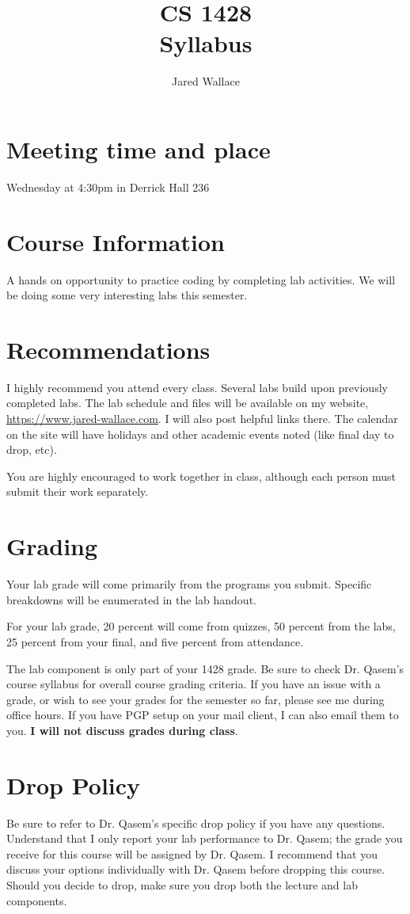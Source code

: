 \documentclass[letterpaper,12pt]{article}
\title{\Large CS 1428\\Syllabus}
\author{Jared Wallace}
\date{}
\begin{document}
\maketitle

\vspace{30mm}

\section*{Meeting time and place}
Wednesday at 4:30pm in Derrick Hall 236

\section*{Course Information}
A hands on opportunity to practice coding by completing lab activities.
We will be doing some very interesting labs this semester.
\section*{Recommendations}
I highly recommend you attend every class. Several labs build upon previously completed
labs. The lab schedule and files will be available on my website, \url{https://www.jared-wallace.com}.
I will also post helpful links there. The calendar on the site will have holidays and
other academic events noted (like final day to drop, etc).

You are highly encouraged to work together in class, although each person must
submit their work separately.

\section*{Grading}
Your lab grade will come primarily from the programs you submit. Specific breakdowns
will be enumerated in the lab handout.

For your lab grade, 20 percent will come from quizzes, 50 percent from the labs,
25 percent from your final, and five percent from attendance.

The lab component is only part of your 1428 grade. Be sure to
check Dr. Qasem's course syllabus for overall course grading criteria. If
you have an issue with a grade, or wish to see your grades for the semester so far,
please see me during office hours. If you have PGP setup on your mail client,
I can also email them to you. \textbf{I will not discuss grades during class}.

\section*{Drop Policy}
Be sure to refer to Dr. Qasem's specific drop policy if you have any
questions. Understand that I only report your lab performance to Dr. Qasem;
the grade you receive for this course will be assigned by Dr. Qasem.
I recommend that you discuss your options individually with Dr. Qasem
before dropping this course. Should you decide to drop, make sure you
drop both the lecture and lab components.
\end{document}
